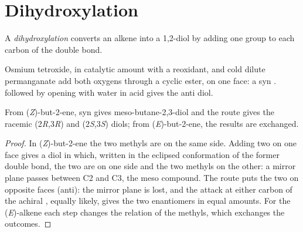 \section{Dihydroxylation}

\begin{definition}[Dihydroxylation]\label{def:b2:alkene-redox:dihydroxylation}
A \emph{dihydroxylation} converts an alkene into a 1,2-diol by adding
one  group to each carbon of the double bond.
\end{definition}

Osmium tetroxide, in catalytic amount with a reoxidant, and cold dilute permanganate add
both oxygens through a cyclic ester, on one face: a syn . 
followed by opening with water in acid gives the anti diol.

\begin{proposition}\label{prop:b2:alkene-redox:diols}
From (\textit{Z})-but-2-ene, syn  gives meso-butane-2,3-diol and the 
route gives the racemic (2\textit{R},3\textit{R}) and (2\textit{S},3\textit{S}) diols; from
(\textit{E})-but-2-ene, the results are exchanged.
\end{proposition}

\begin{proof}
In (\textit{Z})-but-2-ene the two methyls are on the same side. Adding two  on one face
gives a diol in which, written in the eclipsed conformation of the former double bond, the
two  are on one side and the two methyls on the other: a mirror plane passes between
C2 and C3, the meso compound. The  route puts the two  on opposite faces
(anti): the mirror plane is lost, and the attack at either carbon of the achiral ,
equally likely, gives the two enantiomers in equal amounts. For the (\textit{E})-alkene each
step changes the relation of the methyls, which exchanges the outcomes.
\end{proof}

